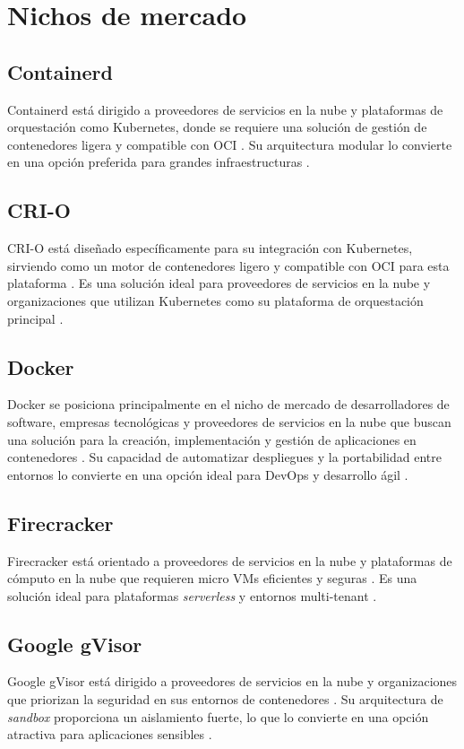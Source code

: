 \section{Nichos de mercado}

\subsection{Containerd}
\noindent
Containerd está dirigido a proveedores de servicios en la nube y plataformas de orquestación como Kubernetes, donde se requiere una solución de gestión de contenedores ligera y compatible con OCI \citep{Vano2023}. Su arquitectura modular lo convierte en una opción preferida para grandes infraestructuras \citep{Zhou2021}.

\subsection{CRI-O}
\noindent
CRI-O está diseñado específicamente para su integración con Kubernetes, sirviendo como un motor de contenedores ligero y compatible con OCI para esta plataforma \citep{CNCF2019}. Es una solución ideal para proveedores de servicios en la nube y organizaciones que utilizan Kubernetes como su plataforma de orquestación principal \citep{151962df5f7e4b9faba0629540c11439}.

\subsection{Docker}
\noindent
Docker se posiciona principalmente en el nicho de mercado de desarrolladores de software, empresas tecnológicas y proveedores de servicios en la nube que buscan una solución para la creación, implementación y gestión de aplicaciones en contenedores \citep{Hill2025}. Su capacidad de automatizar despliegues y la portabilidad entre entornos lo convierte en una opción ideal para DevOps y desarrollo ágil \citep{Mag2025}.

\subsection{Firecracker}
\noindent
Firecracker está orientado a proveedores de servicios en la nube y plataformas de cómputo en la nube que requieren micro VMs eficientes y seguras \citep{Jain}. Es una solución ideal para plataformas \textit{serverless} y entornos multi-tenant \citep{246288}.

\subsection{Google gVisor}
\noindent
Google gVisor está dirigido a proveedores de servicios en la nube y organizaciones que priorizan la seguridad en sus entornos de contenedores \citep{LopezFalcon2024}. Su arquitectura de \textit{sandbox} proporciona un aislamiento fuerte, lo que lo convierte en una opción atractiva para aplicaciones sensibles \citep{gvisor2025}.

